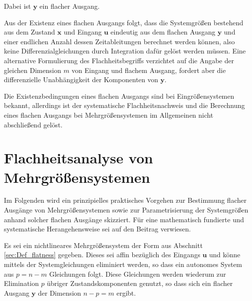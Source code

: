Dabei ist $\mathbf{y}$ ein flacher Ausgang. 

Aus der Existenz eines flachen Ausgangs folgt, dass die Systemgrößen bestehend aus dem Zustand $\mathbf{x}$ und Eingang $\mathbf{u}$ eindeutig aus dem flachen Ausgang $\mathbf{y}$ und einer endlichen Anzahl dessen Zeitableitungen berechnet werden können, also keine Differenzialgleichungen durch Integration dafür gelöst werden müssen. Eine alternative Formulierung des Flachheitsbegriffs verzichtet auf die Angabe der gleichen Dimension $m$ von Eingang und flachem Ausgang, fordert aber die differenzielle Unabhängigkeit der Komponenten von $\mathbf{y}$.

Die Existenzbedingungen eines ﬂachen Ausgangs sind bei Eingrößensystemen bekannt, allerdings ist der systematische Flachheitsnachweis und die Berechnung eines
ﬂachen Ausgangs bei Mehrgrößensystemen im Allgemeinen nicht abschließend gelöst. \cite[S. 185]{NLRT_Roebenack}

\section{Flachheitsanalyse von Mehrgrößensystemen}

Im Folgenden wird ein prinzipielles praktisches Vorgehen zur Bestimmung flacher Ausgänge von Mehrgrößensystemen sowie zur Parametrisierung der Systemgrößen anhand solcher flachen Ausgänge skizziert. Für eine mathematisch fundierte und systematische Herangehensweise sei auf den Beitrag \cite{Fritzsche2016} verwiesen.

Es sei ein nichtlineares Mehrgrößensystem der Form aus Abschnitt \ref{sec:Def_flatness} gegeben. Dieses sei affin bezüglich des Eingangs $\mathbf{u}$ und könne mittels der Systemgleichungen eliminiert werden, so dass ein autonomes System aus $p = n - m$ Gleichungen folgt. Diese Gleichungen werden wiederum zur Elimination $p$ übriger Zustandskomponenten genutzt, so dass sich ein flacher Ausgang $\mathbf{y}$ der Dimension $n - p = m$ ergibt. 

